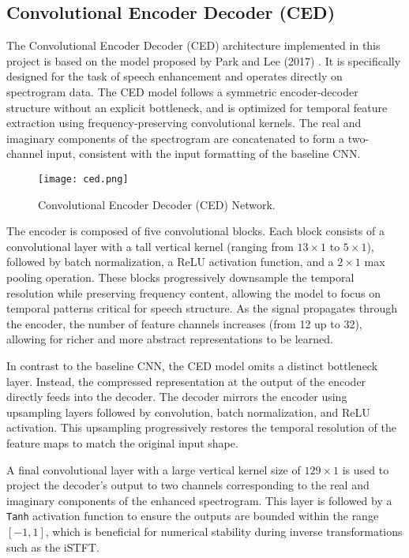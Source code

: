 \subsection{Convolutional Encoder Decoder (CED)}

The Convolutional Encoder Decoder (CED) architecture implemented in this project is based on the model proposed by Park and Lee (2017) \cite{park2017acoustic}. It is specifically designed for the task of speech enhancement and operates directly on spectrogram data. The CED model follows a symmetric encoder-decoder structure without an explicit bottleneck, and is optimized for temporal feature extraction using frequency-preserving convolutional kernels. The real and imaginary components of the spectrogram are concatenated to form a two-channel input, consistent with the input formatting of the baseline CNN.

\begin{figure}[h]
    \centering
    \texttt{[image: ced.png]}
    \caption{\label{fig:ced}Convolutional Encoder Decoder (CED) Network\cite{park2017acoustic}.}
\end{figure}

The encoder is composed of five convolutional blocks. Each block consists of a convolutional layer with a tall vertical kernel (ranging from \(13 \times 1\) to \(5 \times 1\)), followed by batch normalization, a ReLU activation function, and a \(2 \times 1\) max pooling operation. These blocks progressively downsample the temporal resolution while preserving frequency content, allowing the model to focus on temporal patterns critical for speech structure. As the signal propagates through the encoder, the number of feature channels increases (from 12 up to 32), allowing for richer and more abstract representations to be learned.

In contrast to the baseline CNN, the CED model omits a distinct bottleneck layer. Instead, the compressed representation at the output of the encoder directly feeds into the decoder. The decoder mirrors the encoder using upsampling layers followed by convolution, batch normalization, and ReLU activation. This upsampling progressively restores the temporal resolution of the feature maps to match the original input shape.

A final convolutional layer with a large vertical kernel size of \(129 \times 1\) is used to project the decoder’s output to two channels corresponding to the real and imaginary components of the enhanced spectrogram. This layer is followed by a \texttt{Tanh} activation function to ensure the outputs are bounded within the range \([-1, 1]\), which is beneficial for numerical stability during inverse transformations such as the iSTFT.

